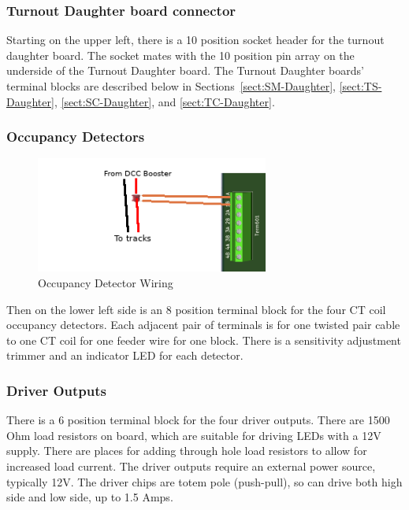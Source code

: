 \subsubsection{Turnout Daughter board connector}

Starting on the upper left, there is a 10 position socket header for the 
turnout daughter board.  The socket mates with the 10 position pin array on 
the underside of the Turnout Daughter board.  The Turnout Daughter boards' 
terminal blocks are described below in Sections~\ref{sect:SM-Daughter}, 
\ref{sect:TS-Daughter}, \ref{sect:SC-Daughter}, and \ref{sect:TC-Daughter}.

\clearpage
\subsubsection{Occupancy Detectors}
\begin{figure}[hbpt]\begin{centering}%
\includegraphics[height=1.5in]{OccupancyDetector-Wiring.png}
\caption{Occupancy Detector Wiring}
\end{centering}\end{figure} 

Then on the lower left side is an 8 position terminal block for the four CT 
coil occupancy detectors.  Each adjacent pair of terminals is for one twisted 
pair cable to one CT coil for one feeder wire for one block. There is a 
sensitivity adjustment trimmer and an indicator LED for each detector.

\subsubsection{Driver Outputs}

There is a 6 position terminal block for the four driver outputs. There are
1500 Ohm load resistors on board, which are suitable for driving LEDs with a
12V supply. There are places for adding through hole load resistors to allow
for increased load current. The driver outputs require an external power
source, typically 12V. The driver chips are totem pole (push-pull), so can
drive both high side and low side, up to 1.5 Amps.


